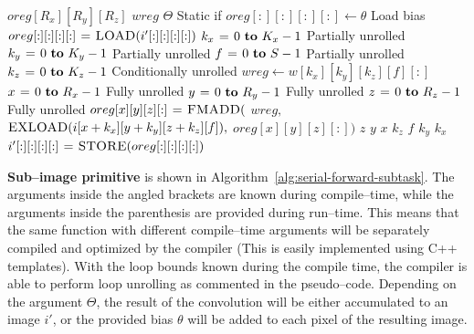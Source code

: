   \begin{algorithm}
    {\footnotesize
      \begin{codebox}
        \li {} $oreg[R_x][R_y][R_z]$
        \li {} $wreg$
        \li \If $\Theta$ \Comment Static if
        \li \Then $oreg[:][:][:][:] \gets \theta$ \Comment Load bias
        \li \Else
        \li       $oreg[:][:][:][:] \mathrel{\hspace{1pt}=\hspace{1pt}} \textnormal{\scshape LOAD}(i'[:][:][:][:])$
        \End \li {}
        \li {} $k_x \gets 0 \To K_x-1$ \Comment Partially unrolled
        \li   \Do {} $k_y \gets 0 \To K_y-1$  \Comment Partially unrolled
        \li     \Do {} $f \gets 0 \To S - 1$ \Comment Partially unrolled
        \li       \Do {} $k_z \gets 0 \To K_z-1$  \Comment Conditionally unrolled
        \li         \Do $wreg \gets w[k_x][k_y][k_z][f][:]$
        \li {} $x \gets 0 \To R_x-1$ \Comment Fully unrolled
        \li   \Do {} $y \gets 0 \To R_y-1$ \Comment Fully unrolled
        \li      \Do {} $z \gets 0 \To R_z-1$ \Comment Fully unrolled
        \li         \Do $oreg[x][y][z][:] \mathrel{\hspace{1pt}=\hspace{1pt}} \textnormal{\scshape FMADD}($
        \li       $wreg,$
        \li       $\textnormal{\scshape EXLOAD}(i[x+k_x][y+k_y][z+k_z][f]),$
        \li       $oreg[x][y][z][:])$
        \End \li {} $z$
        \End \li {} $y$
        \End \li {} $x$
        \End \li {} $k_z$
        \End \li {} $f$
        \End \li {} $k_y$
        \End \li {} $k_x$
        \li $i'[:][:][:][:] \mathrel{\hspace{1pt}=\hspace{1pt}} \textnormal{\scshape STORE}(oreg[:][:][:][:])$
      \end{codebox}
    \caption{The finest granularity primitive that computes a
      sub--image of size $R_x \times R_y \times R_z$ of $S$ images by
      performing $S^2$ convolutions on $S$ input images with kernels
      of size $K_x \times K_y \times K_z$.}
    \label{alg:serial-forward-subtask}
    }
  \end{algorithm}

  {\bf Sub--image primitive} is shown in
  Algorithm~\ref{alg:serial-forward-subtask}.  The arguments inside
  the angled brackets are known during compile--time, while the
  arguments inside the parenthesis are provided during run--time.
  This means that the same function with different compile--time
  arguments will be separately compiled and optimized by the compiler
  (This is easily implemented using C++ templates).  With the loop
  bounds known during the compile time, the compiler is able to
  perform loop unrolling as commented in the pseudo--code.  Depending
  on the argument $\Theta$, the result of the convolution will be
  either accumulated to an image $i'$, or the provided bias $\theta$
  will be added to each pixel of the resulting image.


